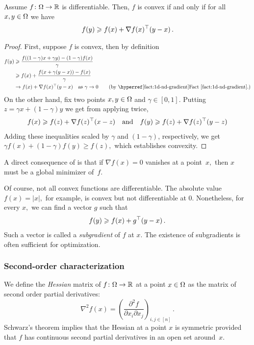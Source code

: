 \begin{proposition}
Assume $f\colon\Omega\to\mathbb{R}$ is differentiable. Then, $f$ is convex if and only if for all $x,y\in\Omega$ we have
\begin{equation}\equationlabel{first-order-lower-bound}
f(y) \ge f(x) + \nabla f(x)^\trans (y-x)\,.
\end{equation}
\end{proposition}
\begin{proof}
First, suppose $f$ is convex, then by definition
\begin{align*}
f(y) &\ge \frac{f((1-\gamma)x+\gamma y)-(1-\gamma)f(x)}{\gamma}\\
&\ge f(x) +\frac{f(x+\gamma(y-x))-f(x)}\gamma\\
&\rightarrow f(x) +\nabla f(x)^\trans (y-x) \quad\text{as $\gamma\to 0$} \tag{by \factref{1d-nd-gradient}.}
\end{align*}
On the other hand, fix two points $x, y\in\Omega$ and $\gamma\in[0,1]$. Putting $z=\gamma x + (1-\gamma)y$ we get from applying  twice,
\[
f(x) \geqslant f(z) + \nabla f(z)^\top (x-z)
\quad\text{and}\quad
f(y) \geqslant f(z) + \nabla f(z)^\top (y-z)
\]
Adding these inequalities scaled by $\gamma$ and $(1-\gamma)$, respectively, we get $\gamma f(x)+(1-\gamma)f(y)\ge f(z),$ which establishes convexity.
\end{proof}

A direct consequence of  is that
if $\nabla f(x)=0$ vanishes at a point~$x,$ then $x$ must be a global minimizer
of~$f.$

\begin{remark}[Subgradients]
Of course, not all convex functions are differentiable. The absolute
value~$f(x)=|x|,$ for example, is convex but not differentiable at $0.$
Nonetheless, for every $x,$ we can find a vector $g$ such that
\[
f(y) \geqslant f(x) + g^\top (y-x)\,.
\]
Such a vector is called a \emph{subgradient} of $f$ at $x.$ The existence of
subgradients is often sufficient for optimization.
\end{remark}

\subsubsection{Second-order characterization}

We define the \emph{Hessian} matrix of $f\colon\Omega\to\mathbb{R}$ at a point $x\in\Omega$ as the matrix of second order partial derivatives:
\[
\nabla^2 f(x) = \left( \frac{\partial^2 f}{\partial x_i\partial x_j} \right)_{i,j\in[n]}\,.
\]
Schwarz's theorem implies that the Hessian at a point $x$ is symmetric provided
that $f$ has continuous second partial derivatives in an open set around~$x.$

